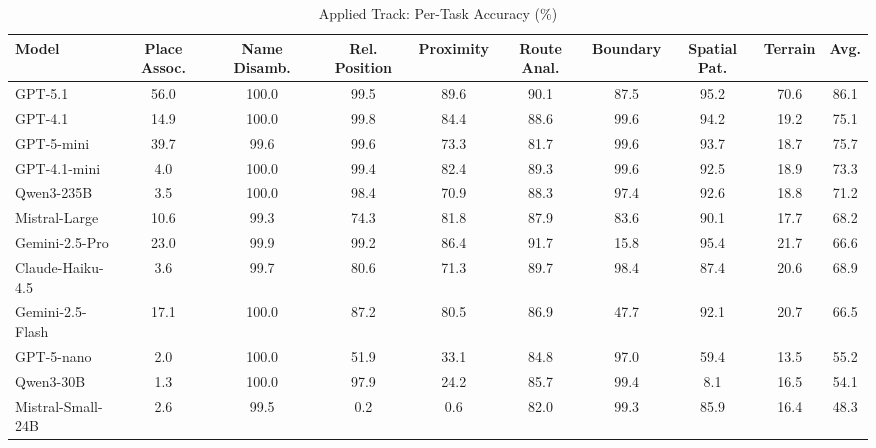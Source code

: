 \begin{table}[t]
\centering
\caption{Applied Track: Per-Task Accuracy (\%)}
\label{tab:applied_results}
\small
\begin{tabular}{lccccccccc}
\toprule
Model & Place Assoc. & Name Disamb. & Rel. Position & Proximity & Route Anal. & Boundary & Spatial Pat. & Terrain & Avg. \\
\midrule
GPT-5.1 & 56.0 & 100.0 & 99.5 & 89.6 & 90.1 & 87.5 & 95.2 & 70.6 & 86.1 \\
GPT-4.1 & 14.9 & 100.0 & 99.8 & 84.4 & 88.6 & 99.6 & 94.2 & 19.2 & 75.1 \\
GPT-5-mini & 39.7 & 99.6 & 99.6 & 73.3 & 81.7 & 99.6 & 93.7 & 18.7 & 75.7 \\
GPT-4.1-mini & 4.0 & 100.0 & 99.4 & 82.4 & 89.3 & 99.6 & 92.5 & 18.9 & 73.3 \\
Qwen3-235B & 3.5 & 100.0 & 98.4 & 70.9 & 88.3 & 97.4 & 92.6 & 18.8 & 71.2 \\
Mistral-Large & 10.6 & 99.3 & 74.3 & 81.8 & 87.9 & 83.6 & 90.1 & 17.7 & 68.2 \\
Gemini-2.5-Pro & 23.0 & 99.9 & 99.2 & 86.4 & 91.7 & 15.8 & 95.4 & 21.7 & 66.6 \\
Claude-Haiku-4.5 & 3.6 & 99.7 & 80.6 & 71.3 & 89.7 & 98.4 & 87.4 & 20.6 & 68.9 \\
Gemini-2.5-Flash & 17.1 & 100.0 & 87.2 & 80.5 & 86.9 & 47.7 & 92.1 & 20.7 & 66.5 \\
GPT-5-nano & 2.0 & 100.0 & 51.9 & 33.1 & 84.8 & 97.0 & 59.4 & 13.5 & 55.2 \\
Qwen3-30B & 1.3 & 100.0 & 97.9 & 24.2 & 85.7 & 99.4 & 8.1 & 16.5 & 54.1 \\
Mistral-Small-24B & 2.6 & 99.5 & 0.2 & 0.6 & 82.0 & 99.3 & 85.9 & 16.4 & 48.3 \\
\bottomrule
\end{tabular}
\end{table}